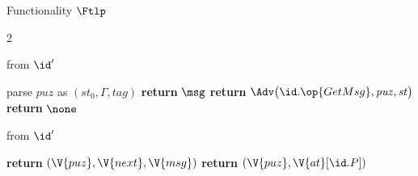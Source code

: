 \begin{interface}[nofloat]{Functionality $\Ftlp$ \\
}
{\begin{multicols}{2}
\columnbreak

 \quad from $\id'$
\begin{algorithmic}[1]
\algcont
\State parse $\mathit{puz}$ as $(\mathit{st}_{0}, \Gamma, \mathit{tag})$
 \label{ln:tlpsolved}
  \State \textbf{return} $\msg$ \label{ln:tlpopen}
\EndIf
{}
  \State \textbf{return} $\Adv\bigl(\id.\op{GetMsg}, \mathit{puz}, \mathit{st}\bigr)$ \label{ln:tlpcorruptopen}
\EndIf
\State \textbf{return} $\none$ \label{ln:tlpnothing}
\algsave
\end{algorithmic}
\vspace{1.4ex}

 \quad from $\id'$
\begin{algorithmic}[1]
\algcont
{}
  \State \textbf{return} $(\V{puz}, \V{next}, \V{msg})$ \label{ln:tlpleakowner}
\EndIf
\State \textbf{return} $(\V{puz}, \V{at}[\id.P])$ \label{ln:tlpleakother}
\algsave
\end{algorithmic}
\end{multicols}}
\end{interface}
